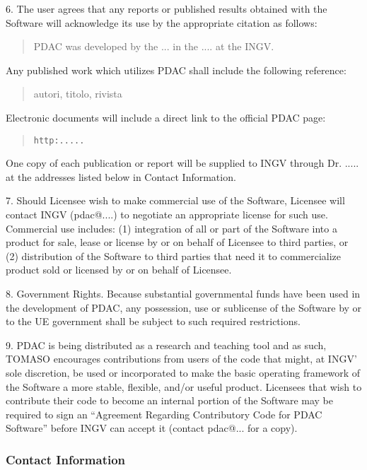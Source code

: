 6. The user agrees that any reports or published results obtained 
with the Software will acknowledge its use by the appropriate citation 
as follows: 

\begin{quote}
 PDAC was developed by the ... in the 
 .... at the 
 INGV.
\end{quote}

Any published work which utilizes PDAC shall include the following reference: 

\begin{quote}
  autori, titolo, rivista
\end{quote}

Electronic documents will include a direct link to the official PDAC page:

\begin{quote}
{\tt http:.....}
\end{quote}

One copy of each publication or report will be supplied to INGV 
through Dr. ..... at the addresses listed below in Contact 
Information.

7. Should Licensee wish to make commercial use of the Software, Licensee 
will contact INGV (pdac@....) to negotiate an appropriate 
license for such use. Commercial use includes: (1) integration of all 
or part of the Software into a product for sale, lease or license by or 
on behalf of Licensee to third parties, or (2) distribution of the 
Software to third parties that need it to commercialize product sold or 
licensed by or on behalf of Licensee.

8. Government Rights. Because substantial governmental funds have been 
used in the development of PDAC, any possession, use or sublicense of 
the Software by or to the UE government shall be subject 
to such required restrictions.

9. PDAC is being distributed as a research and teaching tool and as such, 
TOMASO encourages contributions from users of the code that might, at 
INGV' sole discretion, be used or incorporated to make the basic 
operating framework of the Software a more stable, flexible, and/or 
useful product. Licensees that wish to contribute their code to become 
an internal portion of the Software may be required to sign an 
``Agreement Regarding Contributory Code for PDAC Software''
before INGV can accept it (contact pdac@... for a copy).

\newpage
\subsubsection*{Contact Information}

